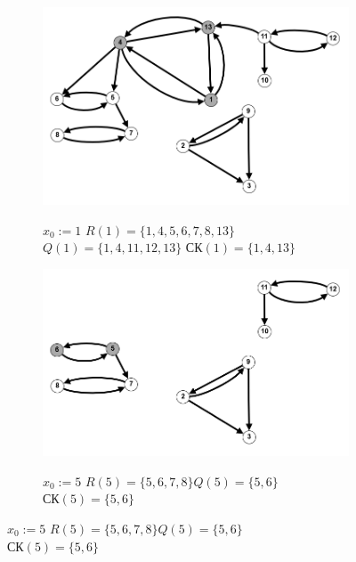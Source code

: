 \documentclass{article}
\begin{document}
\begin{enumerate}
\begin{itemize}
\end{itemize}

\begin{figure}[ht]
     \centering
     \begin{subfigure}[t]{0.47\textwidth}
        \centering
         \caption*{\small{$x_0 := 1$\quad
            $R(1)=\{1,4,5,6,7,8,13\}$\\$Q(1)=\{1,4,11,12,13\}$\qquad\qquad
            $\text{СК}(1) = \{1,4,13\}$}}
         \includegraphics[width=\textwidth]{attachments/1/sk-1.png}
         \label{fig:1_0}
     \end{subfigure}
     \hfill
     \begin{subfigure}[t]{0.5\textwidth}
        \centering
         \caption*{\small{$x_0 := 5$\qquad
            $R(5)=\{5,6,7,8\}$\qquad\qquad$Q(5)=\{5,6\}$\\
            $\text{СК}(5) = \{5,6\}$}}
         \includegraphics[width=\textwidth]{attachments/1/sk-2.png}
         \label{fig:1_1}
     \end{subfigure}

\end{figure}
\end{enumerate}
\end{document}
